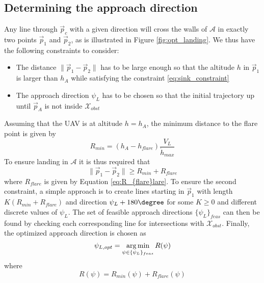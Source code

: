 \subsection{Determining the approach direction}
Any line through $\vec{p}_c$ with a given direction will cross the walls of $\mathcal{A}$ in exactly two points $\vec{p}_1$ and $\vec{p}_2$, as is illustrated in Figure \ref{fig:opt_landing}. 
We thus have the following constraints to consider:
\begin{itemize}
    \item The distance $\|\vec{p}_1-\vec{p}_2\|$ has to be large enough so that the altitude $h$ in $\vec{p}_1$ is larger than $h_A$ while satisfying 
    the constraint \eqref{eq:sink_constraint}
    \item The approach direction $\psi_L$ has to be chosen so that the initial trajectory up until $\vec{p}_A$ is not inside $\mathcal{X}_{obst}$
\end{itemize}
Assuming that the UAV is at altitude $h=h_A$, the minimum distance to the flare point is given by
\begin{equation}
    R_{min}=(h_A-h_{flare})\frac{V_L}{\dot{h}_{max}}
\end{equation}
To ensure landing in $\mathcal{A}$ it is thus required that 
\begin{equation}
    \|\vec{p}_1-\vec{p}_2\|\geq R_{min}+R_{flare}
\end{equation}
where $R_{flare}$ is given by Equation \eqref{eq:R_{flare}lare}. To ensure the second constraint, a simple approach is to 
create lines starting in $\vec{p}_1$ with length $K(R_{min}+R_{flare})$ and direction $\psi_L+180\degree$ for some $K\geq0$ and different discrete values of $\psi_L$. 
The set of feasible approach directions $\{\psi_{L}\}_{feas}$ can then be found by checking each corresponding line for intersections with $\mathcal{X}_{obst}$. Finally, the optimized approach direction is 
chosen as 
\begin{equation}
    \psi_{L,opt} = \operatorname*{arg\,min}_{\psi\in\{\psi_{L}\}_{feas}}R(\psi)
\end{equation}
where
\begin{equation}
    R(\psi)=R_{min}(\psi) + R_{flare}(\psi)
\end{equation}

